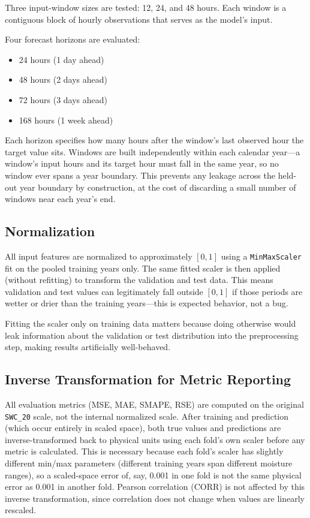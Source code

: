 \documentclass[11pt]{article}
\begin{document}
Three input-window sizes are tested: 12, 24, and 48 hours. Each window is a
contiguous block of hourly observations that serves as the model's input.

Four forecast horizons are evaluated:
\begin{itemize}
    \item 24 hours (1 day ahead)
    \item 48 hours (2 days ahead)
    \item 72 hours (3 days ahead)
    \item 168 hours (1 week ahead)
\end{itemize}
Each horizon specifies how many hours after the window's last observed hour the
target value sits. Windows are built independently within each calendar year---a
window's input hours and its target hour must fall in the same year, so no window
ever spans a year boundary. This prevents any leakage across the held-out year
boundary by construction, at the cost of discarding a small number of windows near
each year's end.

\subsection{Normalization}

All input features are normalized to approximately $[0, 1]$ using a
\texttt{MinMaxScaler} fit on the pooled training years only. The same fitted scaler
is then applied (without refitting) to transform the validation and test data. This
means validation and test values can legitimately fall outside $[0, 1]$ if those
periods are wetter or drier than the training years---this is expected behavior, not
a bug.

Fitting the scaler only on training data matters because doing otherwise would leak
information about the validation or test distribution into the preprocessing step,
making results artificially well-behaved.

\subsection{Inverse Transformation for Metric Reporting}

All evaluation metrics (MSE, MAE, SMAPE, RSE) are computed on the original
\texttt{SWC\_20} scale, not the internal normalized scale. After training and
prediction (which occur entirely in scaled space), both true values and predictions
are inverse-transformed back to physical units using each fold's own scaler before
any metric is calculated. This is necessary because each fold's scaler has slightly
different min/max parameters (different training years span different moisture
ranges), so a scaled-space error of, say, 0.001 in one fold is not the same physical
error as 0.001 in another fold. Pearson correlation (CORR) is not affected by this
inverse transformation, since correlation does not change when values are linearly
rescaled.
\end{document}
